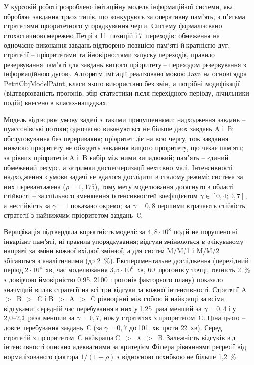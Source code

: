 
У курсовій роботі розроблено імітаційну модель інформаційної системи, яка обробляє завдання
трьох типів, що конкурують за оперативну памʼять, з пʼятьма стратегіями пріоритетного
упорядкування черги. Систему формалізовано стохастичною мережею Петрі з 11~позицій і
7~переходів: обмеження на одночасне виконання завдань відтворено позицією памʼяті й кратністю
дуг, стратегії -- пріоритетами та ймовірностями запуску переходів, правило резервування памʼяті
для завдань вищого пріоритету -- переходом резервування з інформаційною дугою. Алгоритм імітації
реалізовано мовою Java на основі ядра PetriObjModelPaint, класи якого використано без змін, а
потрібні модифікації (відтворюваність прогонів, збір статистики після перехідного періоду,
лічильники подій) внесено в класах-нащадках.

Модель відтворює умову задачі з такими припущеннями: надходження завдань -- пуассонівські
потоки; одночасно виконуються не більше двох завдань A і~B; обслуговування без переривання; пріоритет діє на всю чергу, тож завдання нижчого
пріоритету не обходить завдання вищого пріоритету, що чекає памʼяті; за рівних пріоритетів A і~B
вибір між ними випадковий; памʼять -- єдиний обмежений ресурс, а затримки диспетчеризації
нехтовно малі. Інтенсивності надходження з умови задачі не вдалося дослідити в сталому режимі:
система за них перевантажена ($\rho = 1{,}175$), тому мету моделювання досягнуто в області
стійкості -- за спільного зменшення інтенсивностей коефіцієнтом $\gamma \in [0{,}4;\,0{,}7]$, а
нестійкість за $\gamma = 1$ показано окремо; за $\gamma = 0{,}8$ першими втрачають стійкість
стратегії з найнижчим пріоритетом завдань~C.

Верифікація підтвердила коректність моделі: за $4{,}8\cdot10^8$ подій не порушено ні
інваріант памʼяті, ні правила упорядкування; відгуки змінюються в очікуваному напрямі за зміни
кожної вхідної змінної, а для систем M/M/1 і M/M/2 збігаються з аналітичними (до 2~\%). Експериментальне дослідження (перехідний період
$2\cdot10^4$~хв, час моделювання $3{,}5\cdot10^6$~хв, 60~прогонів у точці, точність 2~\% з
довірчою ймовірністю 0,95, 2100~прогонів факторного плану) показало значущий вплив стратегії на
всі три відгуки за кожної інтенсивності. Стратегії A~$>$~B~$>$~C і B~$>$~A~$>$~C
рівноцінні між собою й найкращі за всіма відгуками: середній час перебування в них у
1,25~раза менший за $\gamma = 0{,}4$ і у 2,0--2,3~раза менший за $\gamma = 0{,}7$, ніж у
стратегіях з пріоритетом~C. Ціна цього -- довге перебування завдань~C (за $\gamma = 0{,}7$ до 101~хв проти 22~хв).
Серед стратегій з пріоритетом~C найкраща C~$>$~A~$>$~B. Залежність відгуків від інтенсивності
описано адекватними за критерієм Фішера рівняннями регресії від нормалізованого фактора
$1/(1-\rho)$ з відносною похибкою не більше 1,2~\%.


